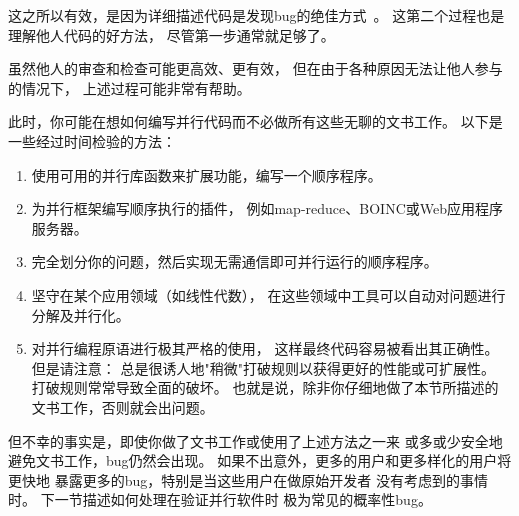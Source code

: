 这之所以有效，是因为详细描述代码是发现bug的绝佳方式~\cite{GlenfordJMyers1979}。
这第二个过程也是理解他人代码的好方法，
尽管第一步通常就足够了。

虽然他人的审查和检查可能更高效、更有效，
但在由于各种原因无法让他人参与的情况下，
上述过程可能非常有帮助。

此时，你可能在想如何编写并行代码而不必做所有这些无聊的文书工作。
以下是一些经过时间检验的方法：

\begin{enumerate}
\item	使用可用的并行库函数来扩展功能，编写一个顺序程序。
\item	为并行框架编写顺序执行的插件，
	例如map-reduce、BOINC或Web应用程序服务器。
\item	完全划分你的问题，然后实现无需通信即可并行运行的顺序程序。
\item	坚守在某个应用领域（如线性代数），
	在这些领域中工具可以自动对问题进行分解及并行化。
\item	对并行编程原语进行极其严格的使用，
	这样最终代码容易被看出其正确性。
	但是请注意：
	总是很诱人地"稍微"打破规则以获得更好的性能或可扩展性。
	打破规则常常导致全面的破坏。
	也就是说，除非你仔细地做了本节所描述的文书工作，否则就会出问题。
\end{enumerate}

但不幸的事实是，即使你做了文书工作或使用了上述方法之一来
或多或少安全地避免文书工作，bug仍然会出现。
如果不出意外，更多的用户和更多样化的用户将更快地
暴露更多的bug，特别是当这些用户在做原始开发者
没有考虑到的事情时。
下一节描述如何处理在验证并行软件时
极为常见的概率性bug。

\QuickQuizEnd

